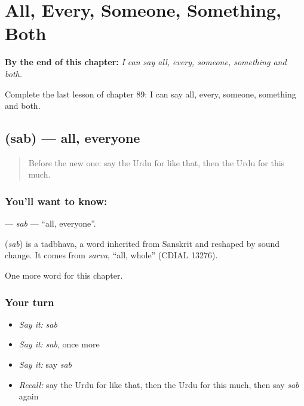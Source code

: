 
\chapter{All, Every, Someone, Something, Both}
\label{ch:ur-all-every-someone-something-both}

\begin{chapteropening}
\textbf{By the end of this chapter:} \emph{I can say all, every, someone, something and both.}

Complete the last lesson of chapter 89: I can say all, every, someone, something and both.
\end{chapteropening}

\section[\texorpdfstring{\ur{سب} (sab)}{سب (sab)}]{ (sab) — all, everyone}

\label{lesson:UR-C89-sab}



\begin{quote}
Before the new one: say the Urdu for like that, then the Urdu for this much.
\end{quote}

\subsection*{You'll want to know: }
\textbf{} — \emph{sab} — \textquotedblleft{}all, everyone\textquotedblright{}.

\begin{cousinweb}
\textbf{} (\emph{sab}) is a tadbhava, a word inherited from Sanskrit and reshaped by sound change. It comes from \emph{sarva}, \textquotedblleft{}all, whole\textquotedblright{} (CDIAL 13276).
\end{cousinweb}

\begin{grammarlens}[title={What you've built}]
One more word for this chapter.
\end{grammarlens}

\subsection*{Your turn}
\begin{itemize}
\raggedright
  \item \emph{Say it:} \emph{sab}
  \item \emph{Say it:} \emph{sab}, once more
  \item \emph{Say it:} say \emph{sab}
  \item \emph{Recall:} say the Urdu for like that, then the Urdu for this much, then say \emph{sab} again
\end{itemize}

